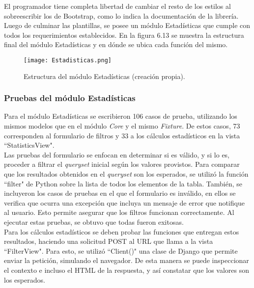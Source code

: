 El programador tiene completa libertad de cambiar el resto de los estilos al sobreescribir los de Bootstrap, como lo indica la documentación de la librería.\\

Luego de culminar las plantillas, se posee un módulo Estadísticas que cumple con todos los requerimientos establecidos. En la figura 6.13 se muestra la estructura final del módulo Estadísticas y en dónde se ubica cada función del mismo.

\begin{figure}[h]
    \centering
    \texttt{[image: Estadisticas.png]}
    \caption{ Estructura del módulo Estadísticas (creación propia).}
    \label{fig:figura6.13}
\end{figure}

\subsubsection{Pruebas del módulo Estadísticas}

Para el módulo Estadísticas se escribieron 106 casos de prueba, utilizando los mismos modelos que en el módulo \textit{Core} y el mismo \textit{Fixture}. De estos casos, 73 corresponden al formulario de filtros y 33 a los cálculos estadísticos en la vista “StatisticsView". \\

Las pruebas del formulario se enfocan en determinar si es válido, y si lo es, proceder a filtrar el \textit{queryset} inicial según los valores provistos. Para comparar que los resultados obtenidos en el \textit{queryset} son los esperados, se utilizó la función “filter" de Python sobre la lista de todos los elementos de la tabla. También, se incluyeron los casos de pruebas en el que el formulario es inválido, en ellos se verifica que ocurra una excepción que incluya un mensaje de error que notifique al usuario. Esto permite asegurar que los filtros funcionan correctamente. Al ejecutar estas pruebas, se obtuvo que todas fueron exitosas.\\

Para los cálculos estadísticos se deben probar las funciones que entregan estos resultados, haciendo una solicitud POST al URL que llama a la vista “FilterView". Para esto, se utilizó “Client()" una clase de Django que permite enviar la petición, simulando el navegador. De esta manera se puede inspeccionar el contexto e incluso el HTML de la respuesta, y así constatar que los valores son los esperados.

